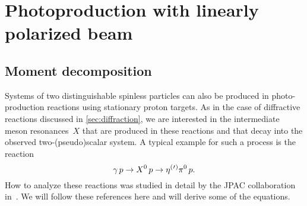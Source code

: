 \section{Photoproduction with linearly polarized beam}%
\label{sec:photoprod}

\subsection{Moment decomposition}%
\label{sec:photoprod:moment}

Systems of two distinguishable spinless particles can also be produced
in photo-production reactions using stationary proton targets.  As in
the case of diffractive reactions discussed in \cref{sec:diffraction},
we are interested in the intermediate meson resonances~$X$ that are
produced in these reactions and that decay into the observed
two-(pseudo)scalar system.  A typical example for such a process is
the reaction
\begin{equation}
  \gamma\, p \to X^0\, p \to \etaOrPr\pi^0\, p.
\end{equation}
How to analyze these reactions was studied in detail by the JPAC
collaboration in~.  We will
follow these references here and will derive some of the
equations.

